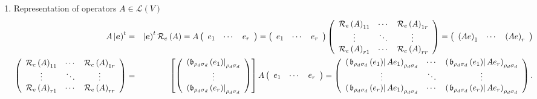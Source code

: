 \documentclass[aps,preprint]{revtex4}
\begin{document}
\begin{enumerate}
\item Representation of operators $A\in \mathcal{L}\left( V\right) $%
\begin{eqnarray}
A\left\vert \overset{}{\boldsymbol{e}}\right) ^{t} &=&\left\vert \overset{}{%
\boldsymbol{e}}\right) ^{t}\mathcal{R}_{e}\left( A\right) =A\left( 
\begin{array}{ccc}
e_{1} & \cdots & e_{r}%
\end{array}%
\right) =\left( 
\begin{array}{ccc}
e_{1} & \cdots & e_{r}%
\end{array}%
\right) \left( 
\begin{array}{ccc}
\mathcal{R}_{e}\left( A\right) _{11} & \cdots & \mathcal{R}_{e}\left(
A\right) _{1r} \\ 
\vdots & \ddots & \vdots \\ 
\mathcal{R}_{e}\left( A\right) _{r1} & \cdots & \mathcal{R}_{e}\left(
A\right) _{rr}%
\end{array}%
\right) =\left( 
\begin{array}{ccc}
\left( Ae\right) _{1} & \cdots & \left( Ae\right) _{r}%
\end{array}%
\right) \\
\left( 
\begin{array}{ccc}
\mathcal{R}_{e}\left( A\right) _{11} & \cdots & \mathcal{R}_{e}\left(
A\right) _{1r} \\ 
\vdots & \ddots & \vdots \\ 
\mathcal{R}_{e}\left( A\right) _{r1} & \cdots & \mathcal{R}_{e}\left(
A\right) _{rr}%
\end{array}%
\right) &=&\left[ \left( 
\begin{array}{c}
\left( \mathfrak{b}_{\rho _{d}\sigma _{d}}\left( e_{1}\right) \right\vert
_{\rho _{d}\sigma _{d}} \\ 
\vdots \\ 
\left( \mathfrak{b}_{\rho _{d}\sigma _{d}}\left( e_{r}\right) \right\vert
_{\rho _{d}\sigma _{d}}%
\end{array}%
\right) \right] A\left( 
\begin{array}{ccc}
e_{1} & \cdots & e_{r}%
\end{array}%
\right) =\left( 
\begin{array}{ccc}
\left( \left. \mathfrak{b}_{\rho _{d}\sigma _{d}}\left( e_{1}\right)
\right\vert Ae_{1}\right) _{\rho _{d}\sigma _{d}} & \cdots & \left( \left. 
\mathfrak{b}_{\rho _{d}\sigma _{d}}\left( e_{1}\right) \right\vert
Ae_{r}\right) _{\rho _{d}\sigma _{d}} \\ 
\vdots & \ddots & \vdots \\ 
\left( \left. \mathfrak{b}_{\rho _{d}\sigma _{d}}\left( e_{r}\right)
\right\vert Ae_{1}\right) _{\rho _{d}\sigma _{d}} & \cdots & \left( \left. 
\mathfrak{b}_{\rho _{d}\sigma _{d}}\left( e_{r}\right) \right\vert
Ae_{r}\right) _{\rho _{d}\sigma _{d}}%
\end{array}%
\right) .
\end{eqnarray}


\end{enumerate}
\end{document}
